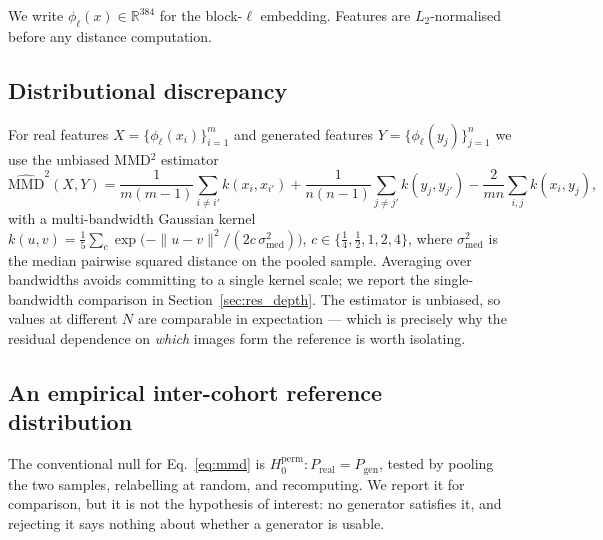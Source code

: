 \documentclass[preprint,12pt,authoryear]{elsarticle}
\newcommand{\mmd}{\mathrm{MMD}}
\begin{document}
We write $\phi_\ell(x) \in \mathbb{R}^{384}$ for the block-$\ell$ embedding.
Features are $L_2$-normalised before any distance computation.

\subsection{Distributional discrepancy}
\label{sec:mmd}

For real features $X = \{\phi_\ell(x_i)\}_{i=1}^{m}$ and generated features
$Y = \{\phi_\ell(y_j)\}_{j=1}^{n}$ we use the unbiased MMD$^2$ estimator
\citep{gretton2012kernel}
\begin{equation}
\widehat{\mmd}^2(X,Y) =
  \frac{1}{m(m\!-\!1)}\!\sum_{i \neq i'}\! k(x_i,x_{i'})
+ \frac{1}{n(n\!-\!1)}\!\sum_{j \neq j'}\! k(y_j,y_{j'})
- \frac{2}{mn}\sum_{i,j} k(x_i,y_j),
\label{eq:mmd}
\end{equation}
with a multi-bandwidth Gaussian kernel
$k(u,v) = \frac{1}{5}\sum_{c} \exp\!\big(-\|u-v\|^2 / (2 c\,\sigma^2_{\mathrm{med}})\big)$,
$c \in \{\tfrac14, \tfrac12, 1, 2, 4\}$, where $\sigma^2_{\mathrm{med}}$ is the
median pairwise squared distance on the pooled sample. Averaging over
bandwidths avoids committing to a single kernel scale; we report the
single-bandwidth comparison in Section~\ref{sec:res_depth}. The estimator is
unbiased, so values at different $N$ are comparable in expectation --- which is
precisely why the residual dependence on \emph{which} images form the reference
is worth isolating.

\subsection{An empirical inter-cohort reference distribution}
\label{sec:cohortnull}

The conventional null for Eq.~\eqref{eq:mmd} is
$H_0^{\mathrm{perm}}: P_{\mathrm{real}} = P_{\mathrm{gen}}$, tested by pooling
the two samples, relabelling at random, and recomputing. We report it for
comparison, but it is not the hypothesis of interest: no generator satisfies it,
and rejecting it says nothing about whether a generator is usable.
\end{document}
